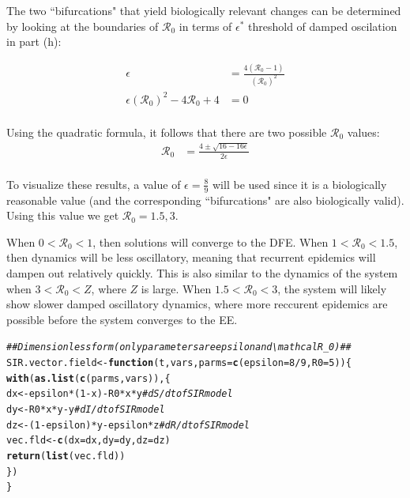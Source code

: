 \documentclass[12pt]{article}\usepackage[]{graphicx}\usepackage[]{color}
\makeatletter
\newcommand{\hlnum}[1]{\textcolor[rgb]{0.686,0.059,0.569}{#1}}%
\newcommand{\hlcom}[1]{\textcolor[rgb]{0.678,0.584,0.686}{\textit{#1}}}%
\newcommand{\hlopt}[1]{\textcolor[rgb]{0,0,0}{#1}}%
\newcommand{\hlstd}[1]{\textcolor[rgb]{0.345,0.345,0.345}{#1}}%
\newcommand{\hlkwa}[1]{\textcolor[rgb]{0.161,0.373,0.58}{\textbf{#1}}}%
\newcommand{\hlkwb}[1]{\textcolor[rgb]{0.69,0.353,0.396}{#1}}%
\newcommand{\hlkwc}[1]{\textcolor[rgb]{0.333,0.667,0.333}{#1}}%
\newcommand{\hlkwd}[1]{\textcolor[rgb]{0.737,0.353,0.396}{\textbf{#1}}}%
\newenvironment{kframe}{%
 \def\at@end@of@kframe{}%
 \ifinner\ifhmode%
  \def\at@end@of@kframe{\end{minipage}}%
  \begin{minipage}{\columnwidth}%
 \fi\fi%
 \def\FrameCommand##1{\hskip\@totalleftmargin \hskip-\fboxsep
 \colorbox{shadecolor}{##1}\hskip-\fboxsep
     \hskip-\linewidth \hskip-\@totalleftmargin \hskip\columnwidth}%
 \MakeFramed {\advance\hsize-\width
   \@totalleftmargin\z@ \linewidth\hsize
   \@setminipage}}%
 {\par\unskip\endMakeFramed%
 \at@end@of@kframe}
\newenvironment{knitrout}{}{} %
\makeatother
\begin{document}
\begin{enumerate}[(a)]
The two ``bifurcations" that yield biologically relevant changes can be determined by looking at the boundaries of $\mathcal R_0$ in terms of $\epsilon^*$ threshold of damped oscilation in part (h):

\begin{align*}
  \epsilon &= \frac{4(\mathcal R_0 - 1)}{(\mathcal R_0)^2}\\
  \epsilon (\mathcal R_0)^2 - 4 \mathcal R_0 + 4 &= 0\\
\end{align*}

Using the quadratic formula, it follows that there are two possible $\mathcal R_0$ values:
\begin{align*}
  \mathcal R_0 &= \frac{4 \pm \sqrt{16 - 16 \epsilon}}{2 \epsilon} \\
\end{align*}

To visualize these results, a value of $\epsilon = \frac{8}{9}$ will be used since it is a biologically reasonable value (and the corresponding ``bifurcations" are also biologically valid). Using this value we get $\mathcal R_0 = 1.5 , 3$.\par
When $0 < \mathcal R_0 < 1$, then solutions will converge to the DFE. When $1 < \mathcal R_0 < 1.5$, then dynamics will be less oscillatory, meaning that recurrent epidemics will dampen out relatively quickly. This is also similar to the dynamics of the system when $3 < \mathcal R_0 < Z$, where $Z$ is large. 
When $1.5 < \mathcal R_0 < 3$, the system will likely show slower damped oscillatory dynamics, where more reccurent epidemics are possible before the system converges to the EE. 

\begin{knitrout}
\color{fgcolor}\begin{kframe}
\begin{alltt}
\hlcom{##Dimensionless form (only parameters are epsilon and \textbackslash{}mathcal R_0)##}
\hlstd{SIR.vector.field} \hlkwb{<-} \hlkwa{function}\hlstd{(}\hlkwc{t}\hlstd{,} \hlkwc{vars}\hlstd{,} \hlkwc{parms}\hlstd{=}\hlkwd{c}\hlstd{(}\hlkwc{epsilon} \hlstd{=} \hlnum{8}\hlopt{/}\hlnum{9}\hlstd{,} \hlkwc{R0} \hlstd{=} \hlnum{5}\hlstd{)) \{}
\hlkwd{with}\hlstd{(}\hlkwd{as.list}\hlstd{(}\hlkwd{c}\hlstd{(parms, vars)), \{}
\hlstd{dx} \hlkwb{<-} \hlstd{epsilon}\hlopt{*}\hlstd{(}\hlnum{1}\hlopt{-}\hlstd{x)}\hlopt{-}\hlstd{R0}\hlopt{*}\hlstd{x}\hlopt{*}\hlstd{y} \hlcom{# dS/dt of SIR model}
\hlstd{dy} \hlkwb{<-} \hlstd{R0}\hlopt{*}\hlstd{x}\hlopt{*}\hlstd{y} \hlopt{-} \hlstd{y} \hlcom{# dI/dt of SIR model}
\hlstd{dz} \hlkwb{<-} \hlstd{(}\hlnum{1}\hlopt{-}\hlstd{epsilon)}\hlopt{*}\hlstd{y} \hlopt{-} \hlstd{epsilon}\hlopt{*}\hlstd{z} \hlcom{#dR/dt of SIR model}
\hlstd{vec.fld} \hlkwb{<-} \hlkwd{c}\hlstd{(}\hlkwc{dx}\hlstd{=dx,} \hlkwc{dy}\hlstd{=dy,} \hlkwc{dz}\hlstd{=dz)}
\hlkwd{return}\hlstd{(}\hlkwd{list}\hlstd{(vec.fld))}
\hlstd{\})}
\hlstd{\}}


\end{alltt}
\end{kframe}
\end{knitrout}
\end{enumerate}
\end{document}
